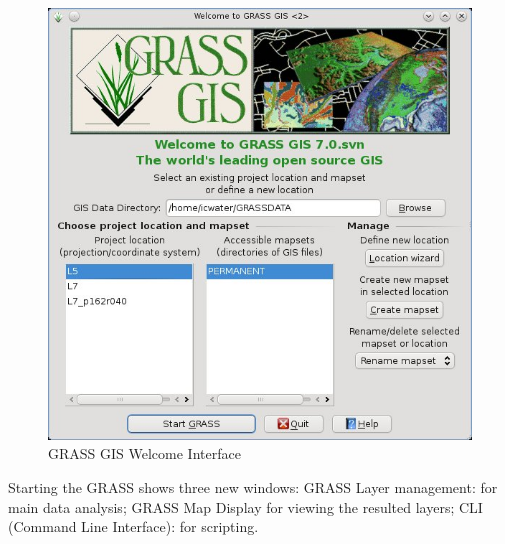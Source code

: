 \begin{figure}[htbp]
   \centering
   \includegraphics[scale=0.4]{gipe006.png}
   \caption{GRASS GIS Welcome Interface}
   \label{fig:gipe006}
\end{figure}

Starting the GRASS shows three new windows:\newline
GRASS Layer management: for main data analysis;\newline
GRASS Map Display for viewing the resulted layers;\newline
CLI (Command Line Interface): for scripting.\newline

